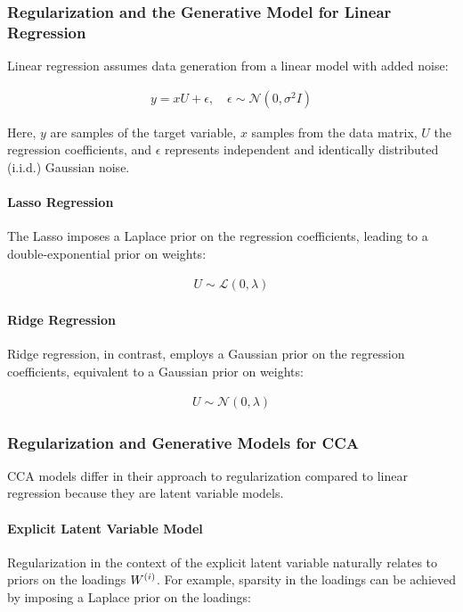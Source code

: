 \subsubsection{Regularization and the Generative Model for Linear Regression}
Linear regression assumes data generation from a linear model with added noise:

\begin{align}
    y = xU + \epsilon, \quad \epsilon \sim \mathcal{N}(0, \sigma^2 I)
\end{align}

Here, $y$ are samples of the target variable, $x$ samples from the data matrix, $U$ the regression coefficients, and $\epsilon$ represents independent and identically distributed (i.i.d.) Gaussian noise.

\paragraph{Lasso Regression}
The Lasso imposes a Laplace prior on the regression coefficients, leading to a double-exponential prior on weights:

\begin{align}
    U \sim \mathcal{L}(0, \lambda)
\end{align}

\paragraph{Ridge Regression}
Ridge regression, in contrast, employs a Gaussian prior on the regression coefficients, equivalent to a Gaussian prior on weights:

\begin{align}
    U \sim \mathcal{N}(0, \lambda)
\end{align}

\subsubsection{Regularization and Generative Models for CCA}
CCA models differ in their approach to regularization compared to linear regression because they are latent variable models.

\paragraph{Explicit Latent Variable Model}
Regularization in the context of the explicit latent variable naturally relates to priors on the loadings \(W^{(i)}\).
For example, sparsity in the loadings can be achieved by imposing a Laplace prior on the loadings:


